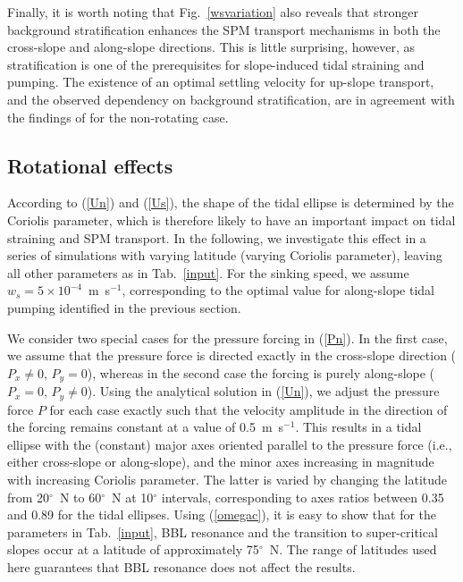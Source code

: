 Finally, it is worth noting that Fig.\ \ref{wsvariation} also reveals
that stronger background stratification enhances the SPM transport
mechanisms in both the cross-slope and along-slope directions. This is
little surprising, however, as stratification is one of the
prerequisites for slope-induced tidal straining and pumping. The
existence of an optimal settling velocity for up-slope transport, and
the observed dependency on background stratification, are in agreement
with the findings of \cite{schulzumlauf2016} for the non-rotating
case.



\subsection{Rotational effects}

According to (\ref{Un}) and (\ref{Us}), the shape of the tidal ellipse
is determined by the Coriolis parameter, which is therefore likely to
have an important impact on tidal straining and SPM transport. In the
following, we investigate this effect in a series of simulations with
varying latitude (varying Coriolis parameter), leaving all other
parameters as in Tab.\ \ref{input}. For the sinking speed, we assume
$w_s=5 \times 10^{-4}$~m~s$^{-1}$, corresponding to the optimal value
for along-slope tidal pumping identified in the previous section.

We consider two special cases for the pressure forcing in
(\ref{Pn}). In the first case, we assume that the pressure force is
directed exactly in the cross-slope direction ($P_x \neq 0$, $P_y=0$),
whereas in the second case the forcing is purely along-slope ($P_x =
0$, $P_y \neq 0$). Using the analytical solution in (\ref{Un}), we
adjust the pressure force $P$ for each case exactly such that the
velocity amplitude in the direction of the forcing remains constant at
a value of 0.5~m~s$^{-1}$. This results in a tidal ellipse with the
(constant) major axes oriented parallel to the pressure force (i.e.,
either cross-slope or along-slope), and the minor axes increasing in
magnitude with increasing Coriolis parameter. The latter is varied by
changing the latitude from 20$^\circ$~N to 60$^\circ$~N at 10$^\circ$
intervals, corresponding to axes ratios between 0.35 and 0.89 for the
tidal ellipses.  Using (\ref{omegac}), it is easy to show that for the
parameters in Tab.\ \ref{input}, BBL resonance and the transition to
super-critical slopes \citep[see][]{schulzumlauf2016} occur at a
latitude of approximately 75$^\circ$~N. The range of latitudes used
here guarantees that BBL resonance does not affect the results.

